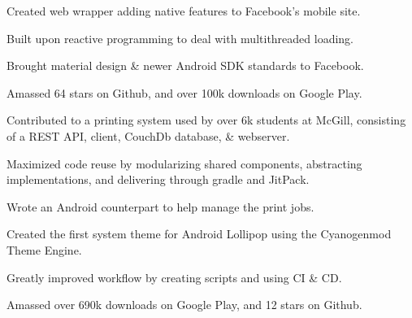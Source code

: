\documentclass[]{allanwang-resume}
\begin{document}
\begin{minipage}[t]{0.66\textwidth}
	\begin{tightemize}
		\item Created web wrapper adding native features to Facebook's mobile site.
		\item Built upon reactive programming to deal with multithreaded loading.
		\item Brought material design \& newer Android SDK standards to Facebook.
		\item Amassed 64 stars on Github, and over 100k downloads on Google Play.
	\end{tightemize}

	\begin{tightemize}
		\item Contributed to a printing system used by over 6k students at McGill, consisting of a REST API, client, CouchDb database, \& webserver.
		\item Maximized code reuse by modularizing shared components, abstracting implementations, and delivering through gradle and JitPack.
		\item Wrote an Android counterpart to help manage the print jobs.
	\end{tightemize}	

	\begin{tightemize}
		\item Created the first system theme for Android Lollipop using the Cyanogenmod Theme Engine.
		\item Greatly improved workflow by creating scripts and using CI \& CD.
		\item Amassed over 690k downloads on Google Play, and 12 stars on Github.
	\end{tightemize}

\end{minipage}
\end{document}
